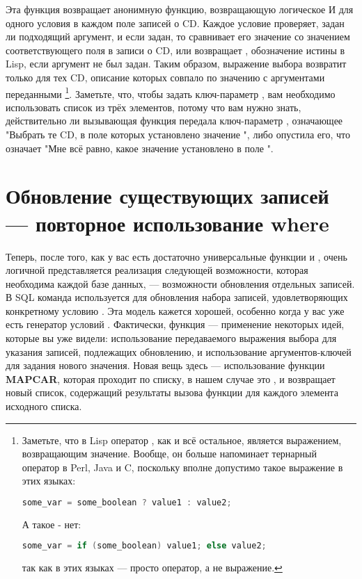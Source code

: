 Эта функция возвращает анонимную функцию, возвращающую логическое И для одного условия в
каждом поле записей о CD. Каждое условие проверяет, задан ли подходящий аргумент, и если
задан, то сравнивает его значение со значением соответствующего поля в записи о CD, или
возвращает , обозначение истины в Lisp, если аргумент не был задан. Таким образом,
выражение выбора возвратит  только для тех CD, описание которых совпало по
значению с аргументами переданными \footnote{Заметьте, что в Lisp оператор
  , как и всё остальное, является выражением, возвращающим значение. Вообще, он
  больше напоминает тернарный оператор  в Perl, Java и C, поскольку вполне
  допустимо такое выражение в этих языках:

\begin{lstlisting}[language=c]
some_var = some_boolean ? value1 : value2;
\end{lstlisting}

А такое - нет:
\begin{lstlisting}[language=C]
some_var = if (some_boolean) value1; else value2;
\end{lstlisting}

так как в этих языках  --- просто оператор, а не выражение.}. Заметьте, что,
чтобы задать ключ-параметр , вам необходимо использовать список из трёх
элементов, потому что вам нужно знать, действительно ли вызывающая функция передала
ключ-параметр , означающее "Выбрать те CD, в поле  которых
установлено значение ", либо опустила его, что означает "Мне всё равно, какое
значение установлено в поле ".

\section{Обновление существующих записей — повторное использование where}

Теперь, после того, как у вас есть достаточно универсальные функции  и
, очень логичной представляется реализация следующей возможности, которая
необходима каждой базе данных, --- возможности обновления отдельных записей. В SQL команда
 используется для обновления набора записей, удовлетворяющих конкретному
условию . Эта модель кажется хорошей, особенно когда у вас уже есть генератор
условий . Фактически, функция  --- применение некоторых идей,
которые вы уже видели: использование передаваемого выражения выбора для указания записей,
подлежащих обновлению, и использование аргументов-ключей для задания нового
значения. Новая вещь здесь --- использование функции \textbf{MAPCAR}, которая проходит по
списку, в нашем случае это , и возвращает новый список, содержащий результаты
вызова функции для каждого элемента исходного списка.

